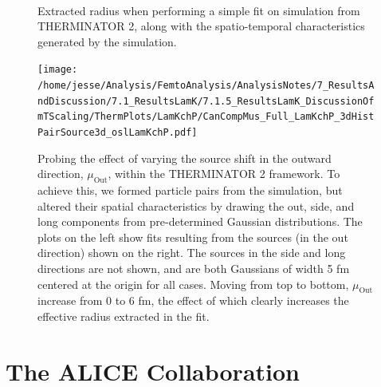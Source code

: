 \documentclass[ALICE,manyauthors]{cernphprep}
\begin{document}
\begin{figure}[h!]
  \centering
   \\
  \caption[Extracted Radius and Pair Sources from THERMINATOR 2]{Extracted radius when performing a simple fit on simulation from THERMINATOR 2, along with the spatio-temporal characteristics generated by the simulation.}
  \label{fig:LamKchP_StdThermSources}
\end{figure}



\begin{figure}[h]
  \centering
  \texttt{[image: /home/jesse/Analysis/FemtoAnalysis/AnalysisNotes/7\_ResultsAndDiscussion/7.1\_ResultsLamK/7.1.5\_ResultsLamK\_DiscussionOfmTScaling/ThermPlots/LamKchP/CanCompMus\_Full\_LamKchP\_3dHistPairSource3d\_oslLamKchP.pdf]}
  \caption[Varying $\mu_{\mathrm{Out}}$ with THERMINATOR 2]{Probing the effect of varying the source shift in the outward direction, $\mu_{\mathrm{Out}}$, within the THERMINATOR 2 framework.  To achieve this, we formed particle pairs from the simulation, but altered their spatial characteristics by drawing the out, side, and long components from pre-determined Gaussian distributions.  The plots on the left show fits resulting from the sources (in the out direction) shown on the right.  The sources in the side and long directions are not shown, and are both Gaussians of width 5 fm centered at the origin for all cases.  Moving from top to bottom, $\mu_{\mathrm{Out}}$ increase from 0 to 6 fm, the effect of which clearly increases the effective radius extracted in the fit.}
  \label{fig:LamKchP_ThermSources_VaryMuOut}
\end{figure}

\clearpage



\section{The ALICE Collaboration}
\label{app:collab}
\end{document}
